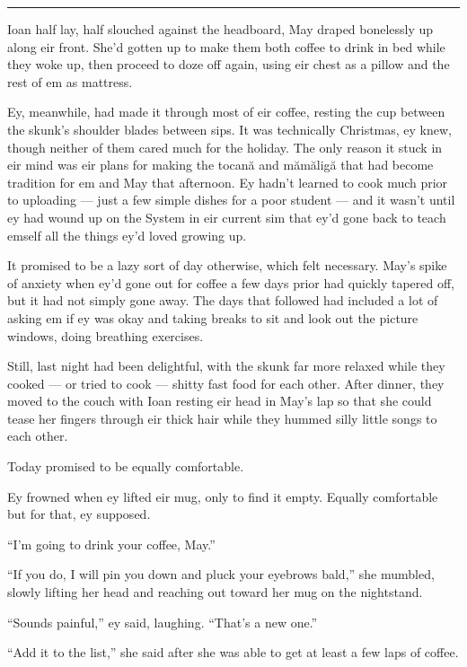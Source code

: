 \begin{center}\rule{0.5\linewidth}{0.5pt}\end{center}

Ioan half lay, half slouched against the headboard, May draped bonelessly up along eir front. She'd gotten up to make them both coffee to drink in bed while they woke up, then proceed to doze off again, using eir chest as a pillow and the rest of em as mattress.

Ey, meanwhile, had made it through most of eir coffee, resting the cup between the skunk's shoulder blades between sips. It was technically Christmas, ey knew, though neither of them cared much for the holiday. The only reason it stuck in eir mind was eir plans for making the tocană and mămăligă that had become tradition for em and May that afternoon. Ey hadn't learned to cook much prior to uploading — just a few simple dishes for a poor student — and it wasn't until ey had wound up on the System in eir current sim that ey'd gone back to teach emself all the things ey'd loved growing up.

It promised to be a lazy sort of day otherwise, which felt necessary. May's spike of anxiety when ey'd gone out for coffee a few days prior had quickly tapered off, but it had not simply gone away. The days that followed had included a lot of asking em if ey was okay and taking breaks to sit and look out the picture windows, doing breathing exercises.

Still, last night had been delightful, with the skunk far more relaxed while they cooked — or tried to cook — shitty fast food for each other. After dinner, they moved to the couch with Ioan resting eir head in May's lap so that she could tease her fingers through eir thick hair while they hummed silly little songs to each other.

Today promised to be equally comfortable.

Ey frowned when ey lifted eir mug, only to find it empty. Equally comfortable but for that, ey supposed.

``I'm going to drink your coffee, May.''

``If you do, I will pin you down and pluck your eyebrows bald,'' she mumbled, slowly lifting her head and reaching out toward her mug on the nightstand.

``Sounds painful,'' ey said, laughing. ``That's a new one.''

``Add it to the list,'' she said after she was able to get at least a few laps of coffee.

